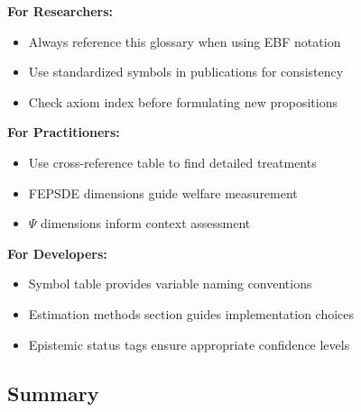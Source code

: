 \begin{tcolorbox}[colback=green!5!white, colframe=green!75!black,
    title=\textbf{Practical Implications}]

\textbf{For Researchers:}
\begin{itemize}[nosep]
    \item Always reference this glossary when using EBF notation
    \item Use standardized symbols in publications for consistency
    \item Check axiom index before formulating new propositions
\end{itemize}

\textbf{For Practitioners:}
\begin{itemize}[nosep]
    \item Use cross-reference table to find detailed treatments
    \item FEPSDE dimensions guide welfare measurement
    \item $\Psi$ dimensions inform context assessment
\end{itemize}

\textbf{For Developers:}
\begin{itemize}[nosep]
    \item Symbol table provides variable naming conventions
    \item Estimation methods section guides implementation choices
    \item Epistemic status tags ensure appropriate confidence levels
\end{itemize}

\end{tcolorbox}


\subsection{Summary}

